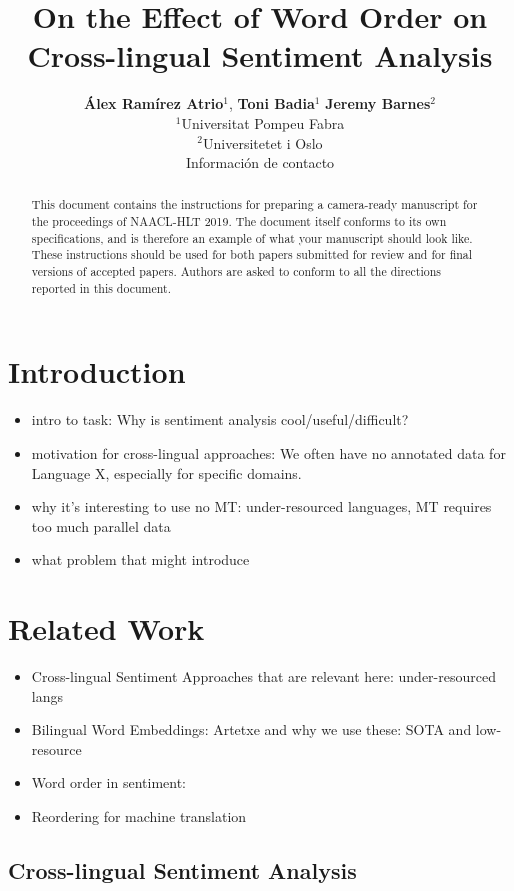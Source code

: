 \documentclass[11pt,a4paper]{article}
\title{On the Effect of Word Order on Cross-lingual Sentiment Analysis}
\author {\textbf{Álex Ramírez Atrio$^1$}, \textbf{Toni Badia$^{1}$} \textbf{Jeremy Barnes$^{2}$}\\
$^1$Universitat Pompeu Fabra\\
$^2$Universitetet i Oslo\\
Información de contacto\\
}
\date{}
\begin{document}
\maketitle
\begin{abstract}
  This document contains the instructions for preparing a camera-ready
  manuscript for the proceedings of NAACL-HLT 2019. The document itself
  conforms to its own specifications, and is therefore an example of
  what your manuscript should look like. These instructions should be
  used for both papers submitted for review and for final versions of
  accepted papers.  Authors are asked to conform to all the directions
  reported in this document.
\end{abstract}


\section{Introduction}

\begin{itemize}
\item intro to task: Why is sentiment analysis cool/useful/difficult?
\item motivation for cross-lingual approaches: We often have no annotated data for Language X, especially for specific domains.
\item why it's interesting to use no MT: under-resourced languages, MT requires too much parallel data
\item what problem that might introduce
\end{itemize}

\section{Related Work}

\begin{itemize}

\item Cross-lingual Sentiment Approaches that are relevant here: under-resourced langs
\item Bilingual Word Embeddings: Artetxe and why we use these: SOTA and low-resource
\item Word order in sentiment:
\item Reordering for machine translation
\end{itemize}

\subsection{Cross-lingual Sentiment Analysis}
\end{document}
